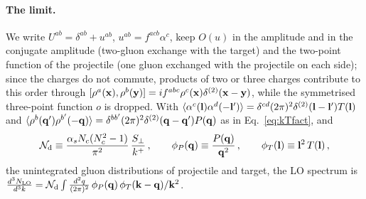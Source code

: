 \paragraph{The limit.} We write $U^{ab}=\delta^{ab}+u^{ab}$, $u^{ab}=f^{acb}\alpha^c$, keep $O(u)$ in the amplitude and in the conjugate amplitude (two-gluon exchange with the target) and the two-point function of the projectile (one gluon exchanged with the projectile on each side); since the charges do not commute, products of two or three charges contribute to this order through $[\rho^a(\mathbf{x}),\rho^b(\mathbf{y})]=if^{abc}\rho^c(\mathbf{x})\delta^{(2)}(\mathbf{x}-\mathbf{y})$, while the symmetrised three-point function $o$ is dropped. With $\langle\alpha^c(\mathbf{l})\alpha^d(-\mathbf{l}')\rangle=\delta^{cd}(2\pi)^2\delta^{(2)}(\mathbf{l}-\mathbf{l}')T(\mathbf{l})$ and $\langle\rho^b(\mathbf{q}')\rho^{b'}(-\mathbf{q})\rangle=\delta^{bb'}(2\pi)^2\delta^{(2)}(\mathbf{q}-\mathbf{q}')P(\mathbf{q})$ as in Eq.~\eqref{eq:kTfact}, and
\begin{align}\label{eq:dilute_not}
\mathcal N_{\rm d}\equiv\frac{\alpha_sN_c(N_c^2-1)}{\pi^2}\,\frac{S_\perp}{k^+}\,,\qquad\phi_P(\mathbf{q})\equiv\frac{P(\mathbf{q})}{\mathbf{q}^2}\,,\qquad\phi_T(\mathbf{l})\equiv\mathbf{l}^2\,T(\mathbf{l})\,,
\end{align}
the unintegrated gluon distributions of projectile and target, the LO spectrum is $\frac{d^3N_{\rm LO}}{d^3k}=\mathcal N_{\rm d}\int\frac{d^2q}{(2\pi)^2}\,\phi_P(\mathbf{q})\,\phi_T(\mathbf{k}-\mathbf{q})/\mathbf{k}^2$.

